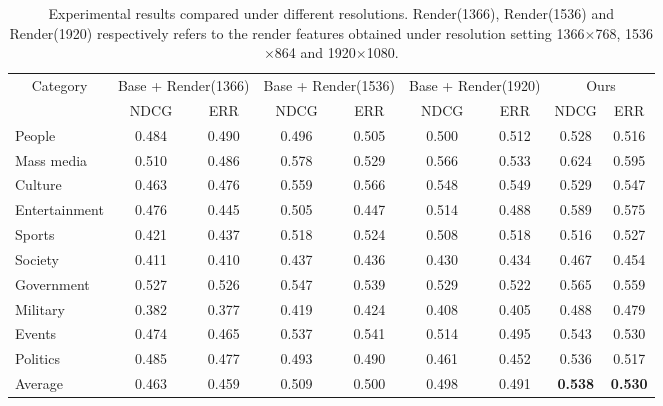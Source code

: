 \begin{table*}[]
\begin{tabular}{|l|cc|cc|cc|cc|}
\hline
\multicolumn{1}{|c|}{\multirow{2}{*}{Category}} & \multicolumn{2}{|c|}{Base + Render(1366)} & \multicolumn{2}{|c|}{Base + Render(1536)} & \multicolumn{2}{|c|}{Base + Render(1920)} & \multicolumn{2}{|c|}{Ours} \\
\multicolumn{1}{|l|}{} & \multicolumn{1}{|c}{NDCG} & \multicolumn{1}{c|}{ERR} & \multicolumn{1}{|c}{NDCG} & \multicolumn{1}{c|}{ERR} & \multicolumn{1}{|c}{NDCG} & \multicolumn{1}{c|}{ERR} & \multicolumn{1}{|c}{NDCG} & \multicolumn{1}{c|}{ERR} \\
\hline 
People & 0.484 & 0.490 & 0.496 & 0.505 & 0.500 & 0.512 & 0.528 & 0.516 \\

Mass media & 0.510 & 0.486 & 0.578 & 0.529 & 0.566 & 0.533 & 0.624 & 0.595 \\

Culture & 0.463 & 0.476 & 0.559 & 0.566 & 0.548 & 0.549 & 0.529 & 0.547 \\

Entertainment & 0.476 & 0.445 & 0.505 & 0.447 & 0.514 & 0.488 & 0.589 & 0.575 \\

Sports & 0.421 & 0.437 & 0.518 & 0.524 & 0.508 & 0.518 & 0.516 & 0.527 \\

Society & 0.411 & 0.410 & 0.437 & 0.436 & 0.430 & 0.434 & 0.467 & 0.454 \\

Government & 0.527 & 0.526 & 0.547 & 0.539 & 0.529 & 0.522 & 0.565 & 0.559 \\

Military & 0.382 & 0.377 & 0.419 & 0.424 & 0.408 & 0.405 & 0.488 & 0.479 \\

Events & 0.474 & 0.465 & 0.537 & 0.541 & 0.514 & 0.495 & 0.543 & 0.530 \\

Politics & 0.485 & 0.477 & 0.493 & 0.490 & 0.461 & 0.452 & 0.536 & 0.517 \\
\hline
Average & 0.463 & 0.459 & 0.509 & 0.500 & 0.498 & 0.491 & \textbf{0.538} & \textbf{0.530} \\
\hline               
\end{tabular}
\caption{Experimental results compared under different resolutions. Render(1366), Render(1536) and Render(1920) respectively refers to the render features obtained under resolution setting 1366$\times$768, 1536$\times$864 and 1920$\times$1080.}
\label{table_cmp3}
\end{table*}


